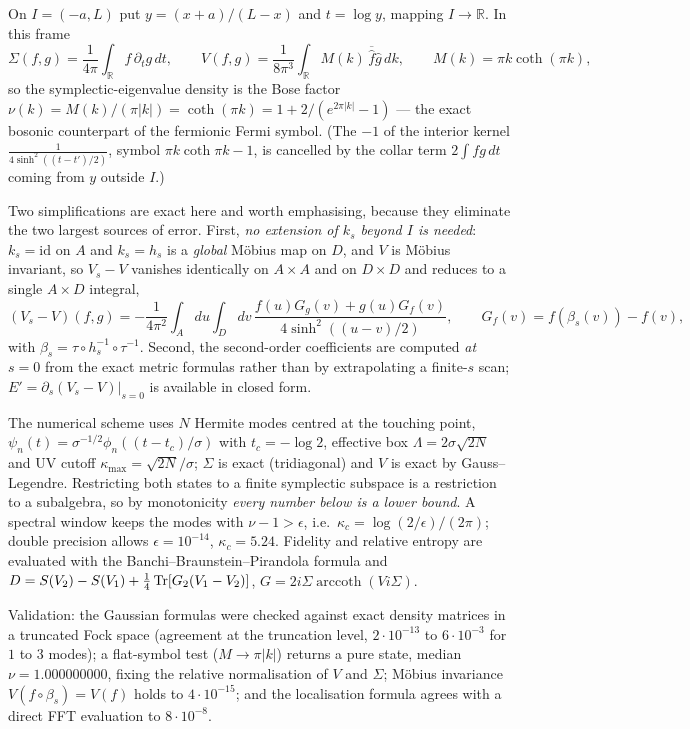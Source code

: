 On $I=(-a,L)$ put $y=(x+a)/(L-x)$ and $t=\log y$, mapping $I\to\mathbb R$.  In this frame
\[
 \Sigma(f,g)=\frac{1}{4\pi}\int_{\mathbb R}f\,\partial_{t}g\,dt,\qquad
 V(f,g)=\frac{1}{8\pi^{3}}\int_{\mathbb R}M(k)\,\overline{\hat f}\hat g\,dk,\qquad
 M(k)=\pi k\coth(\pi k),
\]
so the symplectic-eigenvalue density is the Bose factor
$\nu(k)=M(k)/(\pi|k|)=\coth(\pi k)=1+2/(e^{2\pi|k|}-1)$ --- the exact bosonic counterpart of the fermionic
Fermi symbol.  (The $-1$ of the interior kernel $\frac{1}{4\sinh^{2}((t-t')/2)}$, symbol
$\pi k\coth\pi k-1$, is cancelled by the collar term $2\int fg\,dt$ coming from $y$ outside $I$.)

Two simplifications are exact here and worth emphasising, because they eliminate the two largest sources of
error.  First, \emph{no extension of $k_{s}$ beyond $I$ is needed}: $k_{s}=\mathrm{id}$ on $A$ and
$k_{s}=h_{s}$ is a \emph{global} M\"obius map on $D$, and $V$ is M\"obius invariant, so $V_{s}-V$ vanishes
identically on $A\times A$ and on $D\times D$ and reduces to a single $A\times D$ integral,
\[
 (V_{s}-V)(f,g)=-\frac{1}{4\pi^{2}}\int_{A}du\int_{D}dv\,
 \frac{f(u)G_{g}(v)+g(u)G_{f}(v)}{4\sinh^{2}((u-v)/2)},\qquad
 G_{f}(v)=f(\beta_{s}(v))-f(v),
\]
with $\beta_{s}=\tau\circ h_{s}^{-1}\circ\tau^{-1}$.  Second, the second-order coefficients are computed
\emph{at} $s=0$ from the exact metric formulas rather than by extrapolating a finite-$s$ scan; $E'=
\partial_{s}(V_{s}-V)|_{s=0}$ is available in closed form.

The numerical scheme uses $N$ Hermite modes centred at the touching point, $\psi_{n}(t)=
\sigma^{-1/2}\phi_{n}((t-t_{c})/\sigma)$ with $t_{c}=-\log2$, effective box $\Lambda=2\sigma\sqrt{2N}$ and
UV cutoff $\kappa_{\max}=\sqrt{2N}/\sigma$; $\Sigma$ is exact (tridiagonal) and $V$ is exact by
Gauss--Legendre.  Restricting both states to a finite symplectic subspace is a restriction to a
subalgebra, so by monotonicity \emph{every number below is a lower bound}.  A spectral window keeps the
modes with $\nu-1>\epsilon$, i.e.\ $\kappa_{c}=\log(2/\epsilon)/(2\pi)$; double precision allows
$\epsilon=10^{-14}$, $\kappa_{c}=5.24$.  Fidelity and relative entropy are evaluated with the
Banchi--Braunstein--Pirandola formula \cite[Eq.~(15)]{BBP} and
$D=S(V_{2})-S(V_{1})+\frac14\operatorname{Tr}[G_{2}(V_{1}-V_{2})]$, $G=2i\Sigma\operatorname{arccoth}(Vi\Sigma)$.

Validation: the Gaussian formulas were checked against exact density matrices in a truncated Fock space
(agreement at the truncation level, $2\cdot10^{-13}$ to $6\cdot10^{-3}$ for $1$ to $3$ modes); a flat-symbol
test ($M\to\pi|k|$) returns a pure state, median $\nu=1.000000000$, fixing the relative normalisation of
$V$ and $\Sigma$; M\"obius invariance $V(f\circ\beta_{s})=V(f)$ holds to $4\cdot10^{-15}$; and the
localisation formula agrees with a direct FFT evaluation to $8\cdot10^{-8}$.

